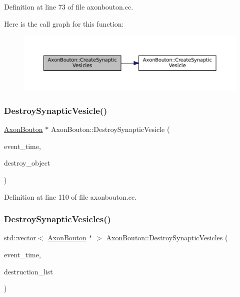 Definition at line 73 of file axonbouton.\+cc.

Here is the call graph for this function\+:\nopagebreak
\begin{figure}[H]
\begin{center}
\leavevmode
\includegraphics[width=350pt]{class_axon_bouton_a0cabe429536722f14ae800c8579168b7_cgraph}
\end{center}
\end{figure}
\mbox{\label{class_axon_bouton_a75592b4ccc589db756183f4aaa694ffe}} 
\subsubsection{\texorpdfstring{Destroy\+Synaptic\+Vesicle()}{DestroySynapticVesicle()}}
{\footnotesize\ttfamily \mbox{\hyperlink{class_axon_bouton}{Axon\+Bouton}} $\ast$ Axon\+Bouton\+::\+Destroy\+Synaptic\+Vesicle (\begin{DoxyParamCaption}\item[{std\+::chrono\+::time\+\_\+point$<$ \mbox{\hyperlink{universe_8h_a0ef8d951d1ca5ab3cfaf7ab4c7a6fd80}{Clock}} $>$}]{event\+\_\+time,  }\item[{\mbox{\hyperlink{class_axon_bouton}{Axon\+Bouton}} $\ast$}]{destroy\+\_\+object }\end{DoxyParamCaption})}



Definition at line 110 of file axonbouton.\+cc.

\mbox{\label{class_axon_bouton_a0fa1c238a29d9e2b84b4d9c556452150}} 
\subsubsection{\texorpdfstring{Destroy\+Synaptic\+Vesicles()}{DestroySynapticVesicles()}}
{\footnotesize\ttfamily std\+::vector$<$ \mbox{\hyperlink{class_axon_bouton}{Axon\+Bouton}} $\ast$ $>$ Axon\+Bouton\+::\+Destroy\+Synaptic\+Vesicles (\begin{DoxyParamCaption}\item[{std\+::chrono\+::time\+\_\+point$<$ \mbox{\hyperlink{universe_8h_a0ef8d951d1ca5ab3cfaf7ab4c7a6fd80}{Clock}} $>$}]{event\+\_\+time,  }\item[{std\+::vector$<$ \mbox{\hyperlink{class_axon_bouton}{Axon\+Bouton}} $\ast$$>$}]{destruction\+\_\+list }\end{DoxyParamCaption})}



